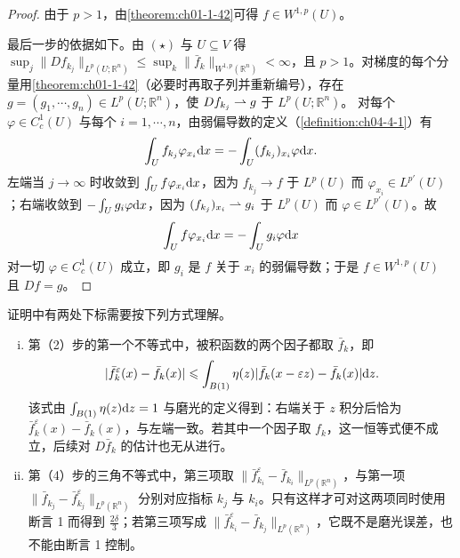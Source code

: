 ﻿\documentclass[../../main.tex]{subfiles}%
\begin{document}
\begin{proof}
由于 $p>1$，由\cref{theorem:ch01-1-42}可得 $f\in W^{1,p}(U)$。%

最后一步的依据如下。由 $(\star)$ 与 $U\subseteq V$ 得 $\sup_j\lVert Df_{k_j}\rVert_{L^p(U;\mathbb{R}^n)}\leqslant\sup_k\lVert\bar f_k\rVert_{W^{1,p}(\mathbb{R}^n)}<\infty$，且 $p>1$。对梯度的每个分量用\cref{theorem:ch01-1-42}（必要时再取子列并重新编号），存在 $g=(g_1,\cdots,g_n)\in L^p(U;\mathbb{R}^n)$，使 $Df_{k_j}\rightharpoonup g$ 于 $L^p(U;\mathbb{R}^n)$。%
对每个 $\varphi\in C_c^1(U)$ 与每个 $i=1,\cdots,n$，由弱偏导数的定义（\cref{definition:ch04-4-1}）有%
\begin{align*}
\int_U f_{k_j}\varphi_{x_i}\mathrm{d} x=-\int_U (f_{k_j})_{x_i}\varphi\mathrm{d} x .
\end{align*}
左端当 $j\to\infty$ 时收敛到 $\int_U f\varphi_{x_i}\mathrm{d} x$，因为 $f_{k_j}\to f$ 于 $L^p(U)$ 而 $\varphi_{x_i}\in L^{p'}(U)$；右端收敛到 $-\int_U g_i\varphi\mathrm{d} x$，因为 $(f_{k_j})_{x_i}\rightharpoonup g_i$ 于 $L^p(U)$ 而 $\varphi\in L^{p'}(U)$。故
\begin{align*}
\int_U f\varphi_{x_i}\mathrm{d} x=-\int_U g_i\varphi\mathrm{d} x
\end{align*}
对一切 $\varphi\in C_c^1(U)$ 成立，即 $g_i$ 是 $f$ 关于 $x_i$ 的弱偏导数；于是 $f\in W^{1,p}(U)$ 且 $Df=g$。
\end{proof}

\begin{remark}\label{remark:ch04-thm-4-11-下标}
证明中有两处下标需要按下列方式理解。
\begin{enumerate}[(i)]
\item 第（2）步的第一个不等式中，被积函数的两个因子都取 $\bar f_k$，即
\begin{align*}
\lvert\bar f_k^\varepsilon(x)-\bar f_k(x)\rvert\leqslant\int_{B(1)}\eta(z)\lvert\bar f_k(x-\varepsilon z)-\bar f_k(x)\rvert\mathrm{d} z .
\end{align*}
该式由 $\int_{B(1)}\eta(z)\mathrm{d} z=1$ 与磨光的定义得到：右端关于 $z$ 积分后恰为 $\bar f_k^\varepsilon(x)-\bar f_k(x)$，与左端一致。若其中一个因子取 $f_k$，这一恒等式便不成立，后续对 $D\bar f_k$ 的估计也无从进行。
\item 第（4）步的三角不等式中，第三项取 $\lVert\bar f_{k_i}^\varepsilon-\bar f_{k_i}\rVert_{L^p(\mathbb{R}^n)}$，与第一项 $\lVert\bar f_{k_j}-\bar f_{k_j}^\varepsilon\rVert_{L^p(\mathbb{R}^n)}$ 分别对应指标 $k_j$ 与 $k_i$。只有这样才可对这两项同时使用断言 1 而得到 $\frac{2\delta}{3}$；若第三项写成 $\lVert\bar f_{k_i}^\varepsilon-\bar f_{k_j}\rVert_{L^p(\mathbb{R}^n)}$，它既不是磨光误差，也不能由断言 1 控制。
\end{enumerate}
\end{remark}
\end{document}
